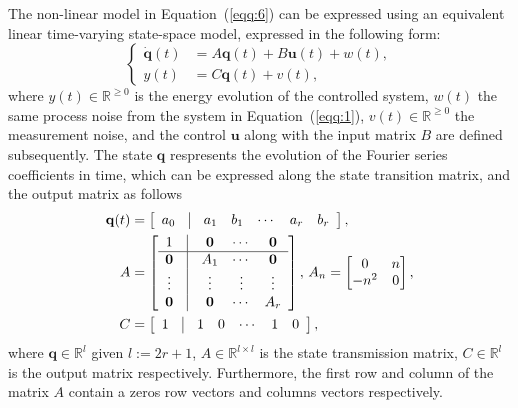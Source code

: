 \documentclass[letterpaper,10pt,conference]{ieeeconf}
\begin{document}
The non-linear model in Equation~(\ref{eqq:6}) can be expressed using an equivalent linear time-varying state-space model, expressed in the following form:
\begin{equation}\label{eqq:7}\begin{cases}
  \dot{\mathbf{q}}(t)&=A\mathbf{q}(t)+B\mathbf{u}(t)+w(t),\\
  y(t)&=C\mathbf{q}(t)+v(t),
\end{cases}\end{equation}
where $y(t)\in\mathbb{R}^{\geq 0}$ is the energy evolution of the controlled system, $w(t)$ the same process noise from the system in Equation~(\ref{eqq:1}), $v(t)\in\mathbb{R}^{\geq 0}$ the measurement noise, and the control $\mathbf{u}$ along with the input matrix $B$ are defined subsequently. The state $\mathbf{q}$ respresents the evolution of the Fourier series coefficients in time, which can be expressed along the state transition matrix, and the output matrix as follows
\begin{equation}\begin{split}
  \mathbf{q}(t)&=\left[\begin{array}{ccccccc}
    a_0 & \vline & a_1 & b_1 & \cdots & a_r & b_r
  \end{array}\right],\\
  A&=\left[\begin{array}{ccccc}
    1          & \vline & \mathbf{0} & \cdots & \mathbf{0} \\\hline
    \mathbf{0} & \vline & A_1        & \cdots & \mathbf{0} \\
    \vdots     & \vline & \vdots     & \vdots & \vdots     \\
    \mathbf{0} & \vline & \mathbf{0} & \cdots & A_r 
  \end{array}\right],\,A_n=\begin{bmatrix}0 & n \\ -n^2 & 0\end{bmatrix},\\
  C&=\left[\begin{array}{ccccccc}
    1 & \vline & 1 & 0 & \cdots & 1 & 0
  \end{array}\right],
\end{split}\end{equation}
where $\mathbf{q}\in\mathbb{R}^l$ given $l:=2r+1$, $A\in\mathbb{R}^{l\times l}$ is the state transmission matrix, $C\in\mathbb{R}^l$ is the output matrix respectively. Furthermore, the first row and column of the matrix $A$ contain a zeros row vectors and columns vectors respectively.
\end{document}
